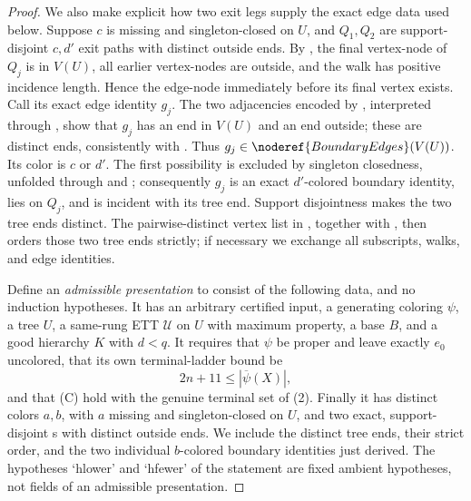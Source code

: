 \begin{proof}
We also make explicit how two exit legs supply the exact edge data used
below.  Suppose $c$ is missing and singleton-closed on $U$, and $Q_1,Q_2$
are support-disjoint $c,d'$ exit paths with distinct outside ends.  By
, the final vertex-node of $Q_j$ is in $V(U)$, all
earlier vertex-nodes are outside, and the walk has positive incidence
length.  Hence the edge-node immediately before its final vertex exists.
Call its exact edge identity $g_j$.  The two adjacencies encoded by
, interpreted through
, show that $g_j$ has an end in $V(U)$ and an end
outside; these are distinct ends, consistently with
.  Thus
$g_j\in\noderef{BoundaryEdges}(V(U))$.  Its color is $c$
or $d'$.  The first possibility is excluded by singleton closedness,
unfolded through  and
; consequently $g_j$ is an exact
$d'$-colored boundary identity, lies on $Q_j$, and is incident with its
tree end.  Support disjointness makes the two tree ends distinct.  The
pairwise-distinct vertex list in , together with
, then orders those two tree ends strictly; if
necessary we exchange all subscripts, walks, and edge identities.

Define an \emph{admissible presentation} to consist of the following
data, and no induction hypotheses.  It has an arbitrary certified input,
a generating coloring $\psi$, a tree $U$, a same-rung ETT $\mathcal U$
on $U$ with maximum property, a base $B$, and a good hierarchy $K$ with
$d<q$.  It requires that $\psi$ be proper and leave exactly $e_0$
uncolored, that its own terminal-ladder bound be
\[
             2n+11\leq |\overline\psi(X)|,                    \tag{3}
\]
and that (C) hold with the genuine terminal set of (2).  Finally it has
distinct colors $a,b$, with $a$ missing and singleton-closed on $U$, and
two exact, support-disjoint s with distinct outside
ends.  We include the distinct tree ends, their strict order, and the two
individual $b$-colored boundary identities just derived.  The hypotheses
`hlower' and `hfewer' of the statement are fixed ambient hypotheses, not
fields of an admissible presentation.


\end{proof}
